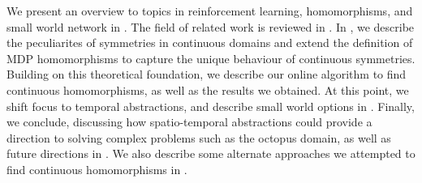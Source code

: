 We present an overview to topics in reinforcement learning,
homomorphisms, and small world network in .
The field of related work is reviewed in .
In , we describe the peculiarites of symmetries in
continuous domains and extend the definition of MDP homomorphisms to
capture the unique behaviour of continuous symmetries.  Building on this
theoretical foundation, we describe our online algorithm to find
continuous homomorphisms, as well as the results we obtained. At this
point, we shift focus to temporal abstractions, and describe small world
options in .  Finally, we conclude, discussing how
spatio-temporal abstractions could provide a direction to solving
complex problems such as the octopus domain, as well as future
directions  in . We also describe some
alternate approaches we attempted to find continuous homomorphisms in
.

